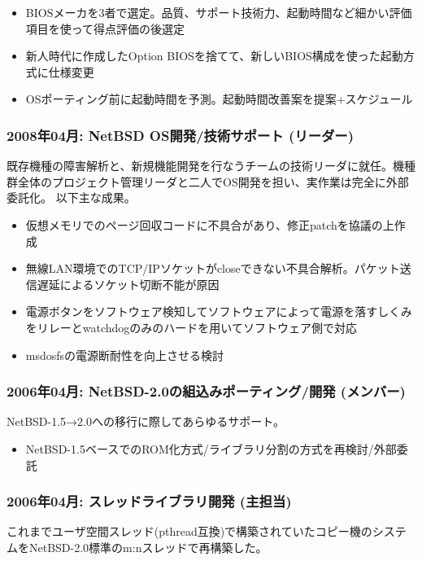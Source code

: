 \documentclass[letterpaper]{article}
\begin{document}
\begin{itemize}
  \item BIOSメーカを3者で選定。品質、サポート技術力、起動時間など細かい評価項目を使って得点評価の後選定
  \item 新人時代に作成したOption BIOSを捨てて、新しいBIOS構成を使った起動方式に仕様変更
  \item OSポーティング前に起動時間を予測。起動時間改善案を提案+スケジュール
\end{itemize}

\subsubsection*{2008年04月: NetBSD OS開発/技術サポート (リーダー)}
既存機種の障害解析と、新規機能開発を行なうチームの技術リーダに就任。機種群全体のプロジェクト管理リーダと二人でOS開発を担い、実作業は完全に外部委託化。
以下主な成果。

\begin{itemize}
  \item 仮想メモリでのページ回収コードに不具合があり、修正patchを協議の上作成
  \item 無線LAN環境でのTCP/IPソケットがcloseできない不具合解析。パケット送信遅延によるソケット切断不能が原因
  \item 電源ボタンをソフトウェア検知してソフトウェアによって電源を落すしくみをリレーとwatchdogのみのハードを用いてソフトウェア側で対応
  \item msdosfsの電源断耐性を向上させる検討
\end{itemize}

\subsubsection*{2006年04月: NetBSD-2.0の組込みポーティング/開発 (メンバー)}
NetBSD-1.5→2.0への移行に際してあらゆるサポート。

\begin{itemize}
  \item NetBSD-1.5ベースでのROM化方式/ライブラリ分割の方式を再検討/外部委託
\end{itemize}

\subsubsection*{2006年04月: スレッドライブラリ開発 (主担当)}
これまでユーザ空間スレッド(pthread互換)で構築されていたコピー機のシステムをNetBSD-2.0標準のm:nスレッドで再構築した。
\end{document}
